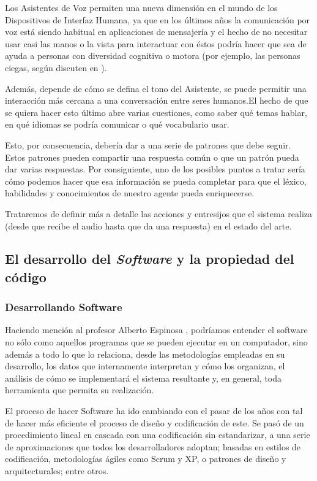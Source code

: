 Los Asistentes de Voz permiten una nueva dimensión en el mundo de los Dispositivos de Interfaz Humana, ya que en los últimos años la comunicación por voz está siendo habitual en aplicaciones de mensajería y el hecho de no necesitar usar casi las manos o la vista para interactuar con éstos podría hacer que sea de ayuda a personas con diversidad cognitiva o motora (por ejemplo, las personas ciegas, según discuten en  \cite{va-benefits}).

Además, depende de cómo se defina el tono del Asistente, se puede permitir una interacción más cercana a una conversación entre seres humanos.El hecho de que se quiera hacer esto último abre varias cuestiones, como saber qué temas hablar, en qué idiomas se podría comunicar o qué vocabulario usar.

Esto, por consecuencia, debería dar a una serie de patrones que debe seguir. Estos patrones pueden compartir una respuesta común o que un patrón pueda dar varias respuestas. Por consiguiente, uno de los posibles puntos a tratar sería cómo podemos hacer que esa información se pueda completar para que el léxico, habilidades y conocimientos de nuestro agente pueda enriquecerse.

Trataremos de definir más a detalle las acciones y entresijos que el sistema realiza (desde que recibe el audio hasta que da una respuesta) en el estado del arte.

\subsection{El desarrollo del \textit{Software} y la propiedad del código }
\subsubsection{Desarrollando Software}
Haciendo mención al profesor Alberto Espinosa \cite{Prieto2006-ss}, podríamos entender el software no sólo como aquellos programas que se pueden ejecutar en un computador, sino además a todo lo que lo relaciona, desde las metodologías empleadas en su desarrollo, los datos que internamente interpretan y cómo los organizan, el análisis de cómo se implementará el sistema resultante y, en general, toda herramienta que permita su realización. 

El proceso de hacer Software ha ido cambiando con el pasar de los años con tal de hacer más eficiente el proceso de diseño y codificación de este. Se pasó de un procedimiento lineal en cascada con una codificación sin estandarizar, a una serie de aproximaciones que todos los desarrolladores adoptan; basadas en estilos de codificación, metodologías ágiles como Scrum y XP, o patrones de diseño y arquitecturales; entre otros. 

